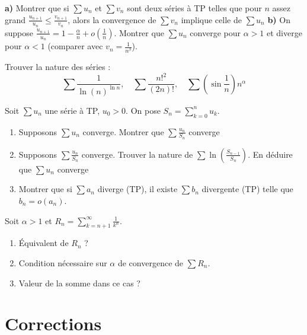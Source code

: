\begin{exercice}
\textbf{a)} Montrer que si $\sum u_{n}$ et $\sum v_{n}$ sont deux séries à TP telles que pour $n$ assez grand $\frac{u_{n+1}}{u_{n}}\le\frac{v_{n+1}}{v_{n}}$, alors la convergence de $\sum v_{n}$ implique celle de $\sum u_{n}$
\textbf{b)} On suppose $\frac{u_{n+1}}{u_{n}}=1-\frac{\alpha}{n}+o(\frac{1}{n})$. Montrer que $\sum u_{n}$ converge pour $\alpha>1$ et diverge pour $\alpha<1$ (comparer avec $v_n = \frac{1}{n^\beta}$).
\end{exercice}

\begin{exercice}
Trouver la nature des séries :
$$ \sum \frac{1}{\ln(n)^{\ln n}}, \quad \sum \frac{n!^2}{(2n)!}, \quad \sum (\sin\frac{1}{n}) n^\alpha $$
\end{exercice}

\begin{exercice}
Soit $\sum u_{n}$ une série à TP, $u_0 > 0$. On pose $S_{n}=\sum_{k=0}^{n}u_{k}$.
\begin{enumerate}
    \item Supposons $\sum u_{n}$ converge. Montrer que $\sum\frac{u_{n}}{S_{n}}$ converge
    \item Supposons $\sum\frac{u_{n}}{S_{n}}$ converge. Trouver la nature de $\sum \ln(\frac{S_{n-1}}{S_{n}})$. En déduire que $\sum u_{n}$ converge
    \item Montrer que si $\sum a_{n}$ diverge (TP), il existe $\sum b_{n}$ divergente (TP) telle que $b_{n}=o(a_{n})$.
\end{enumerate}
\end{exercice}

\begin{exercice}
Soit $\alpha>1$ et $R_{n}=\sum_{k=n+1}^{\infty}\frac{1}{k^{\alpha}}$.
\begin{enumerate}
    \item Équivalent de $R_{n}$ ? 
    \item Condition nécessaire sur $\alpha$ de convergence de $\sum R_{n}$.
    \item Valeur de la somme dans ce cas ?
\end{enumerate}
\end{exercice}

\newpage
\section{Corrections}

